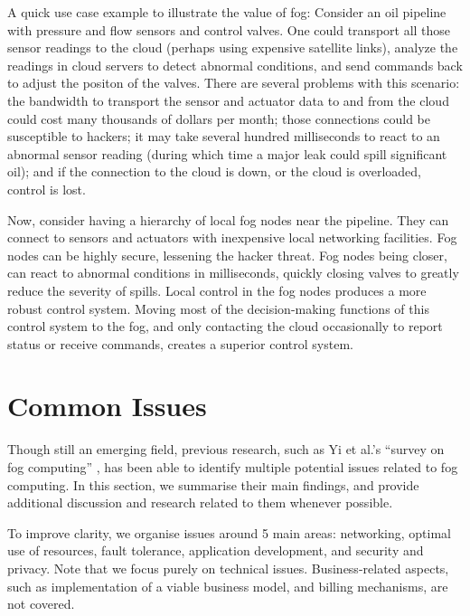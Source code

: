 \documentclass{article}
\begin{document}
A quick use case example to illustrate the value of fog\cite{openfogconsortium2017}: 
Consider an oil pipeline with pressure and flow sensors and control valves. One could transport all those sensor readings to the cloud (perhaps using expensive satellite links), analyze the readings in cloud servers to detect abnormal conditions, and send commands back to adjust the positon of the valves.
There are several problems with this scenario: the bandwidth to transport the sensor and actuator data to and from the cloud could cost many thousands of dollars per month; those connections could be susceptible to hackers; it may take several hundred milliseconds to react to an abnormal sensor reading (during which time a major leak could spill significant oil); and if the connection to the cloud is down, or the cloud is overloaded, control is lost. 

Now, consider having a hierarchy of local fog nodes near the pipeline. They can connect to sensors and actuators with inexpensive local networking facilities. Fog nodes can be highly secure, lessening the hacker threat. Fog nodes being closer, can react to abnormal conditions in milliseconds, quickly closing valves to greatly reduce the severity of spills. 
Local control in the fog nodes produces a more robust control system. Moving most of the decision-making functions of this control system to the fog, and only contacting the cloud occasionally to report status or receive commands, creates a superior control system.

\section{Common Issues}

Though still an emerging field, previous research, such as Yi et al.'s ``survey on fog computing'' \cite{yi2015survey}, has been able to identify multiple potential issues related to fog computing. In this section, we summarise their main findings, and provide additional discussion and research related to them whenever possible.

To improve clarity, we organise issues around 5 main areas: networking, optimal use of resources, fault tolerance, application development, and security and privacy. Note that we focus purely on technical issues. Business-related aspects, such as implementation of a viable business model, and billing mechanisms, are not covered.
\end{document}
